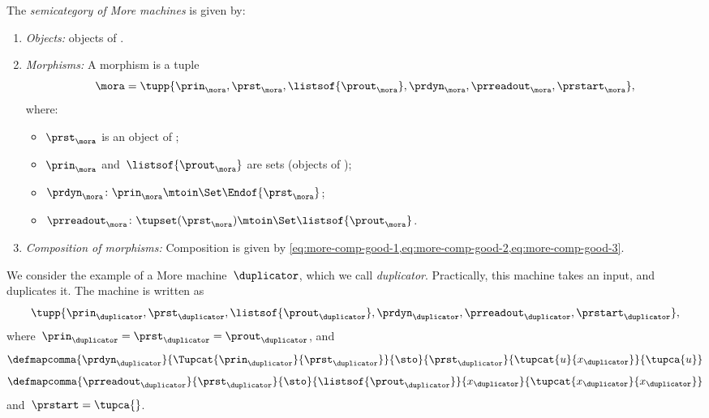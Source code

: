 \begin{definition}[\More]
    \label{def:More}
    The \emph{semicategory of More machines} \More is given by:
    \begin{enumerate}
        \item \emph{Objects:} objects of \Set.
        \item \emph{Morphisms:}
              A morphism is a tuple
              \begin{equation}
                  \mora = \tupp{\prin_{\mora},\prst_{\mora},\listsof{\prout_{\mora}},\prdyn_{\mora},\prreadout_{\mora},\prstart_{\mora}},
              \end{equation}
              where:
              \begin{itemize}
                  \item $\prst_{\mora}$ is an object of \SetL;
                  \item $\prin_{\mora}$ and~$\listsof{\prout_{\mora}}$ are sets (objects of \Set);
                  \item $ \prdyn_{\mora} \colon \prin_{\mora} \mtoin\Set \Endof{\prst_{\mora}}$;
                  \item $ \prreadout_{\mora} \colon \tupset(\prst_{\mora})  \mtoin\Set \listsof{\prout_{\mora}}$.
              \end{itemize}
        \item \emph{Composition of morphisms:}
              Composition is given by \cref{eq:more-comp-good-1,eq:more-comp-good-2,eq:more-comp-good-3}.
    \end{enumerate}
\end{definition}

\begin{example}[Duplicator]
    We consider the example of a More machine~$\duplicator$, which we call \emph{duplicator}.
    Practically, this machine takes an input, and duplicates it.
    The machine is written as
    \begin{equation*}
        \tupp{\prin_{\duplicator},\prst_{\duplicator},\listsof{\prout_{\duplicator}},\prdyn_{\duplicator},\prreadout_{\duplicator},\prstart_{\duplicator}},
    \end{equation*}
    where~$\prin_{\duplicator}=\prst_{\duplicator}=\prout_\duplicator$, and
    \begin{equation*}
        \defmapcomma{\prdyn_\duplicator}
        {\Tupcat{\prin_\duplicator}{\prst_\duplicator}}
        {\sto}
        {\prst_\duplicator}
        {\tupcat{u}{x_\duplicator}}
        {\tupca{u}}
    \end{equation*}
    \begin{equation*}
        \defmapcomma{\prreadout_\duplicator}
        {\prst_\duplicator}
        {\sto}
        {\listsof{\prout_\duplicator}}
        {x_\duplicator}
        {\tupcat{x_\duplicator}{x_\duplicator}}
    \end{equation*}
    and~$\prstart=\tupca{}$.
\end{example}

